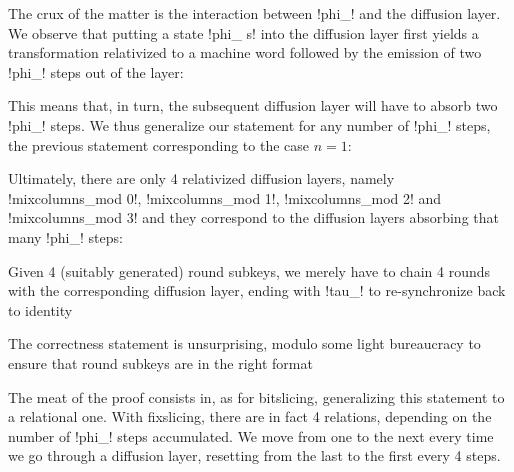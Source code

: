 \documentclass[draft,english]{jflart}
\begin{document}

The crux of the matter is the interaction between \coqe!phi_! and the
diffusion layer. We observe that putting a state \coqe!phi_ s! into
the diffusion layer first yields a transformation relativized to a
machine word followed by the emission of two \coqe!phi_! steps out of
the layer:
%
\begin{coro}
\end{coro}


This means that, in turn, the subsequent diffusion layer will have to
absorb two \coqe!phi_! steps. We thus generalize our statement for any
number of \coqe!phi_! steps, the previous statement corresponding to
the case $n = 1$:
%

Ultimately, there are only 4 relativized diffusion layers, namely
%
\coqe!mixcolumns_mod 0!,
%
\coqe!mixcolumns_mod 1!,
%
\coqe!mixcolumns_mod 2!
%
and
%
\coqe!mixcolumns_mod 3!
%
and they correspond to the diffusion layers absorbing that many
\coqe!phi_! steps:
%
\begin{prop}
\end{prop}



Given 4 (suitably generated) round subkeys, we merely have to chain 4
rounds with the corresponding diffusion layer, ending with \coqe!tau_!
to re-synchronize back to identity
%


The correctness statement is unsurprising, modulo some light
bureaucracy to ensure that round subkeys are in the right format
%
\begin{theo}
\end{theo}

The meat of the proof consists in, as for bitslicing, generalizing
this statement to a relational one. With fixslicing, there are in fact
4 relations, depending on the number of \coqe!phi_! steps accumulated.
We move from one to the next every time we go through a diffusion
layer, resetting from the last to the first every 4 steps.
\end{document}
